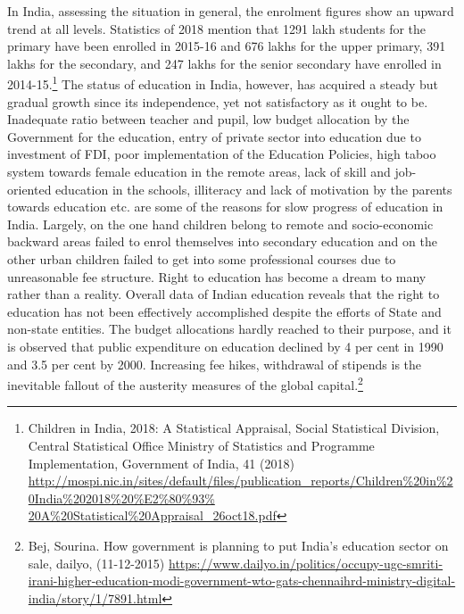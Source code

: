 \begin{multicols}{2}
\noi
In India, assessing the situation in general, the enrolment figures show an upward trend at all
levels. Statistics of 2018 mention that 1291 lakh students for the primary have been enrolled
in 2015-16 and 676 lakhs for the upper primary, 391 lakhs for the secondary, and 247 lakhs
for the senior secondary have enrolled in 2014-15.\footnote{Children in India, 2018: A Statistical Appraisal, Social Statistical Division, Central Statistical Office Ministry of Statistics and Programme Implementation, Government of India, 41 (2018) \url{http://mospi.nic.in/sites/default/files/publication_reports/Children\%20in\%20India\%202018\%20\%E2\%80\%93\% 20A\%20Statistical\%20Appraisal_26oct18.pdf}} The status of education in India, however, has acquired a steady but gradual growth since its independence, yet not satisfactory as it ought to be. Inadequate ratio between teacher and pupil, low budget
allocation by the Government for the education, entry of private sector into education due to
investment of FDI, poor implementation of the Education Policies, high taboo system
towards female education in the remote areas, lack of skill and job-oriented education in the
schools, illiteracy and lack of motivation by the parents towards education etc. are some of
the reasons for slow progress of education in India. Largely, on the one hand children belong
to remote and socio-economic backward areas failed to enrol themselves into secondary
education and on the other urban children failed to get into some professional courses due to
unreasonable fee structure. Right to education has become a dream to many rather than a
reality. Overall data of Indian education reveals that the right to education has not been
effectively accomplished despite the efforts of State and non-state entities. The budget
allocations hardly reached to their purpose, and it is observed that public expenditure on
education declined by 4 per cent in 1990 and 3.5 per cent by 2000. Increasing fee hikes,
withdrawal of stipends is the inevitable fallout of the austerity measures of the global
capital.\footnote{Bej, Sourina. How government is planning to put India's education sector on sale, dailyo, (11-12-2015)
\url{https://www.dailyo.in/politics/occupy-ugc-smriti-irani-higher-education-modi-government-wto-gats-chennaihrd-ministry-digital-india/story/1/7891.html}}


\end{multicols}
